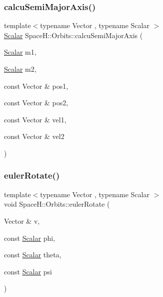 \subsubsection{\texorpdfstring{calcu\+Semi\+Major\+Axis()}{calcuSemiMajorAxis()}}
{\footnotesize\ttfamily template$<$typename Vector , typename Scalar $>$ \\
\mbox{\hyperlink{create_kepler_8cpp_a8c2981f3f834be9448a6ab06c28748eb}{Scalar}} Space\+H\+::\+Orbits\+::calcu\+Semi\+Major\+Axis (\begin{DoxyParamCaption}\item[{\mbox{\hyperlink{create_kepler_8cpp_a8c2981f3f834be9448a6ab06c28748eb}{Scalar}}}]{m1,  }\item[{\mbox{\hyperlink{create_kepler_8cpp_a8c2981f3f834be9448a6ab06c28748eb}{Scalar}}}]{m2,  }\item[{const Vector \&}]{pos1,  }\item[{const Vector \&}]{pos2,  }\item[{const Vector \&}]{vel1,  }\item[{const Vector \&}]{vel2 }\end{DoxyParamCaption})\hspace{0.3cm}{\ttfamily [inline]}}

\mbox{\label{namespace_space_h_1_1_orbits_ab06b7e85a786928255938378f9a97e26}} 
\subsubsection{\texorpdfstring{euler\+Rotate()}{eulerRotate()}}
{\footnotesize\ttfamily template$<$typename Vector , typename Scalar $>$ \\
void Space\+H\+::\+Orbits\+::euler\+Rotate (\begin{DoxyParamCaption}\item[{Vector \&}]{v,  }\item[{const \mbox{\hyperlink{create_kepler_8cpp_a8c2981f3f834be9448a6ab06c28748eb}{Scalar}}}]{phi,  }\item[{const \mbox{\hyperlink{create_kepler_8cpp_a8c2981f3f834be9448a6ab06c28748eb}{Scalar}}}]{theta,  }\item[{const \mbox{\hyperlink{create_kepler_8cpp_a8c2981f3f834be9448a6ab06c28748eb}{Scalar}}}]{psi }\end{DoxyParamCaption})}

